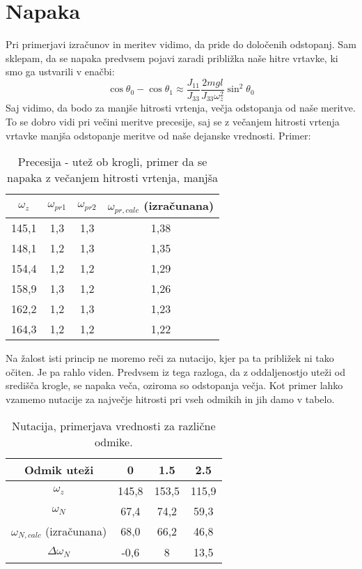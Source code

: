 \documentclass[11pt, a4paper]{article}
\theoremstyle{definition}
\theoremstyle{example}
\theoremstyle{izrek}
\begin{document}
\pagebreak
\section{Napaka}
Pri primerjavi izračunov in meritev vidimo, da pride do določenih odstopanj. Sam sklepam, da se napaka predvsem pojavi zaradi približka naše hitre vrtavke, ki smo ga ustvarili v enačbi: 
\begin{equation}
	\label{skrajna kota}
	\cos\theta_0 - \cos\theta_1 \approx \frac{J_{11}}{J_{33}}\frac{2mgl}{J_{33}\omega^2_z}\sin^2\theta_0
\end{equation}
Saj vidimo, da bodo za manjše hitrosti vrtenja, večja odstopanja od naše meritve. To se dobro vidi pri večini meritve precesije, saj se z večanjem hitrosti vrtenja vrtavke manjša odstopanje meritve od naše dejanske vrednosti. Primer:
\begin{table}[h]
	\centering
	\begin{tabular}{|c|c|c|c|}
		\hline
		\rule{0pt}{3ex}   
		$\omega_z$ & $\omega_{pr1}$\: & $\omega_{pr2}$\: & $\omega_{pr,calc}$\: (izračunana)\\
		\hline
		\hline
		145,1 &	1,3 &	1,3 &	1,38\\
		\hline
		148,1 &	1,2 &	1,3 &	1,35\\
		\hline
		154,4 &	1,2 &	1,2 &	1,29\\
		\hline
		158,9 &	1,3 &	1,2 &	1,26\\
		\hline
		162,2 &	1,2 &	1,3 &	1,23\\
		\hline
		164,3 &	1,2 &	1,2 &	1,22\\
		\hline
		
		
	\end{tabular}
\caption{Precesija - utež ob krogli, primer da se napaka z večanjem hitrosti vrtenja, manjša}
\end{table}
Na žalost isti princip ne moremo reči za nutacijo, kjer pa ta približek ni tako očiten. Je pa rahlo viden. Predvsem iz tega razloga, da z oddaljenostjo uteži od središča krogle, se napaka veča, oziroma so odstopanja večja. Kot primer lahko vzamemo nutacije za največje hitrosti pri vseh odmikih in jih damo v tabelo.
\begin{table}[h]
	\centering
	\begin{tabular}{|c|c|c|c|}
		\hline
		\rule{0pt}{3ex}   
		Odmik uteži & 0 & 1.5 & 2.5\\
		\hline
		\hline
		$\omega_z$ & 145,8  & 153,5 & 115,9\\
		\hline
		$\omega_{N}$ & 67,4 & 74,2 & 59,3  \\
		\hline
		$\omega_{N,calc}$\: (izračunana) & 68,0 & 66,2 & 46,8 \\
		\hline
		$\Delta \omega_N$ & -0,6 & 8 & 13,5 \\
		\hline
	\end{tabular}
	\caption{Nutacija, primerjava vrednosti za različne odmike.}
\end{table}
\vspace{2mm}
	
\end{document}
